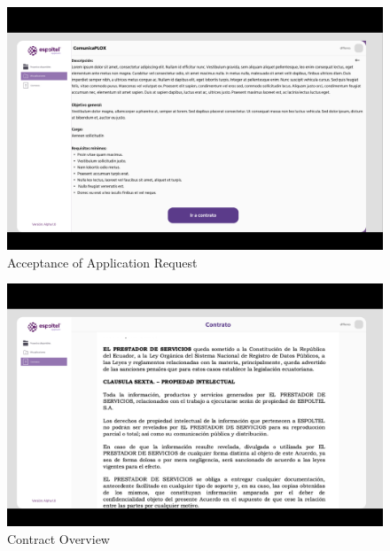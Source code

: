 \documentclass{scrreprt}
\begin{document}
\begin{figure}[H]
    
    \centering \small
    \includegraphics[width=1\textwidth]{WebPrototype/Projectsflow6.png}
    \caption{Acceptance of Application Request}
\end{figure} 


\begin{figure}[H] 
    
    \centering \small
    \includegraphics[width=1\textwidth]{WebPrototype/Projectsflow65.png}
    \caption{Contract Overview}
\end{figure} 
\end{document}
